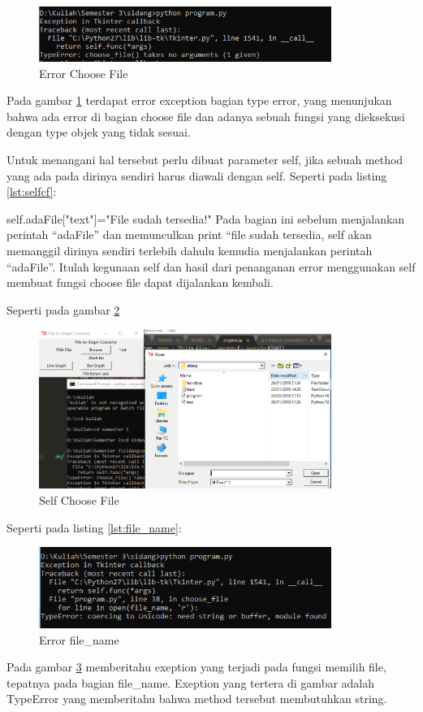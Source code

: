 \begin{figure}[!htbp]
	\centerline{\includegraphics[width=0.85\textwidth]{figures/3/errorcf.PNG}}
	\caption{Error Choose File}
	\label{fig:errorcf}
\end{figure}
Pada gambar \ref{fig:errorcf} terdapat error exception bagian type error, yang menunjukan bahwa ada error di bagian choose file dan adanya sebuah fungsi yang dieksekusi dengan type objek yang tidak sesuai.

Untuk menangani hal tersebut perlu dibuat parameter self, jika sebuah method yang ada pada dirinya sendiri harus diawali dengan self.
Seperti pada listing \ref{lst:selfcf}:


self.adaFile["text"]="File sudah tersedia!" Pada bagian ini sebelum menjalankan perintah “adaFile” dan memunculkan print “file sudah tersedia, self akan memanggil dirinya sendiri terlebih dahulu kemudia menjalankan perintah “adaFile”. Itulah kegunaan self dan hasil dari penanganan error menggunakan self membuat fungsi choose file dapat dijalankan kembali.

Seperti pada gambar \ref{fig:selfcf}
\begin{figure}[!htbp]
	\centerline{\includegraphics[width=0.85\textwidth]{figures/3/selfcf.PNG}}
	\caption{Self Choose File}
	\label{fig:selfcf}
\end{figure}

Seperti pada listing \ref{lst:file_name}:


\begin{figure}[!htbp]
	\centerline{\includegraphics[width=0.85\textwidth]{figures/3/file_name.PNG}}
	\caption{Error file\_name}
	\label{fig:file_name}
\end{figure}
Pada gambar \ref{fig:file_name} memberitahu exeption yang terjadi pada fungsi memilih file, tepatnya pada bagian file\_name. Exeption yang tertera di gambar adalah TypeError yang memberitahu bahwa method tersebut membutuhkan string.

